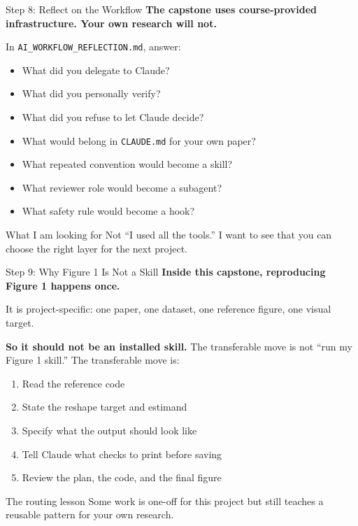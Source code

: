 \documentclass[aspectratio=169, 11pt]{beamer}
\begin{document}
\begin{frame}{Step 8: Reflect on the Workflow}
  \textbf{The capstone uses course-provided infrastructure. Your own research will not.}

  \vspace{0.6em}
  In \texttt{AI\_WORKFLOW\_REFLECTION.md}, answer:

  \vspace{0.4em}
  \begin{itemize}\small
    \item What did you delegate to Claude?
    \item What did you personally verify?
    \item What did you refuse to let Claude decide?
    \item What would belong in \texttt{CLAUDE.md} for your own paper?
    \item What repeated convention would become a skill?
    \item What reviewer role would become a subagent?
    \item What safety rule would become a hook?
  \end{itemize}

  \vspace{0.5em}
  \begin{block}{What I am looking for}
    Not ``I used all the tools.'' I want to see that you can choose the right layer for the next project.
  \end{block}
\end{frame}

\begin{frame}{Step 9: Why Figure 1 Is Not a Skill}
  \textbf{Inside this capstone, reproducing Figure 1 happens once.}

  \vspace{0.6em}
  It is project-specific: one paper, one dataset, one reference figure, one visual target.

  \vspace{0.8em}
  \textbf{So it should not be an installed skill.} The transferable move is not ``run my Figure 1 skill.'' The transferable move is:

  \vspace{0.5em}
  \begin{enumerate}\small
    \item Read the reference code
    \item State the reshape target and estimand
    \item Specify what the output should look like
    \item Tell Claude what checks to print before saving
    \item Review the plan, the code, and the final figure
  \end{enumerate}

  \vspace{0.5em}
  \begin{block}{The routing lesson}
    Some work is one-off for this project but still teaches a reusable pattern for your own research.
  \end{block}
\end{frame}
\end{document}

